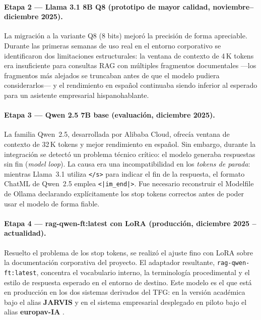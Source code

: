 \paragraph{Etapa 2 --- Llama 3.1 8B Q8 (prototipo de mayor calidad, noviembre--diciembre 2025).}
La migración a la variante Q8 (8 bits) mejoró la precisión de forma apreciable. Durante las primeras semanas de uso real en el entorno corporativo se identificaron dos limitaciones estructurales: la ventana de contexto de 4\,K tokens era insuficiente para consultas RAG con múltiples fragmentos documentales ---los fragmentos más alejados se truncaban antes de que el modelo pudiera considerarlos--- y el rendimiento en español continuaba siendo inferior al esperado para un asistente empresarial hispanohablante.

\paragraph{Etapa 3 --- Qwen 2.5 7B base (evaluación, diciembre 2025).}
La familia Qwen~2.5, desarrollada por Alibaba Cloud, ofrecía ventana de contexto de 32\,K tokens y mejor rendimiento en español. Sin embargo, durante la integración se detectó un problema técnico crítico: el modelo generaba respuestas sin fin (\textit{model loop}). La causa era una incompatibilidad en los \textit{tokens de parada}: mientras Llama~3.1 utiliza \texttt{</s>} para indicar el fin de la respuesta, el formato ChatML de Qwen~2.5 emplea \texttt{<|im\_end|>}. Fue necesario reconstruir el Modelfile de Ollama declarando explícitamente los stop tokens correctos antes de poder usar el modelo de forma fiable.

\paragraph{Etapa 4 --- rag-qwen-ft:latest con LoRA (producción, diciembre 2025 -- actualidad).}
Resuelto el problema de los stop tokens, se realizó el ajuste fino con LoRA sobre la documentación corporativa del proyecto. El adaptador resultante, \texttt{rag-qwen-ft:latest}, concentra el vocabulario interno, la terminología procedimental y el estilo de respuesta esperado en el entorno de destino. Este modelo es el que está en producción en los dos sistemas derivados del TFG: en la versión académica bajo el alias \textbf{JARVIS} y en el sistema empresarial desplegado en piloto bajo el alias \textbf{europav-IA} \cite{qwen2024qwen25blog,hu2021lora}.

